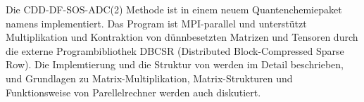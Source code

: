 Die CDD-DF-SOS-ADC(2) Methode ist in einem neuem Quantenchemiepaket namens \mchem{} implementiert.  
Das Program ist MPI-parallel und unterstützt Multiplikation und Kontraktion von dünnbesetzten Matrizen und Tensoren durch die externe Programbibliothek DBCSR (Distributed Block-Compressed Sparse Row). 
Die Implemtierung und die Struktur von \mchem{} werden im Detail beschrieben, und Grundlagen zu Matrix-Multiplikation, Matrix-Strukturen und Funktionsweise von Parellelrechner werden auch diskutiert.


